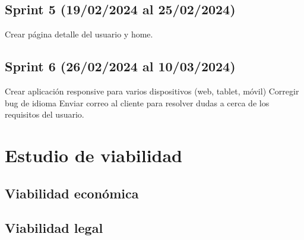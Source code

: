 \subsection{Sprint 5 (19/02/2024 al 25/02/2024)}
Crear página detalle del usuario y home.

\subsection{Sprint 6 (26/02/2024 al 10/03/2024)}
Crear aplicación responsive para varios dispositivos (web, tablet, móvil)
Corregir bug de idioma
Enviar correo al cliente para resolver dudas a cerca de los requisitos del usuario.

\section{Estudio de viabilidad}

\subsection{Viabilidad económica}

\subsection{Viabilidad legal}


